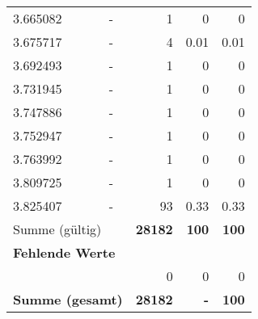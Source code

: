 \begin{longtable}{lXrrr}
        3.665082 & \multicolumn{1}{X}{-} & %
          \num{1} &
          \num[round-mode=places,round-precision=2]{0} &
          \num[round-mode=places,round-precision=2]{0} \\

        3.675717 & \multicolumn{1}{X}{-} & %
          \num{4} &
          \num[round-mode=places,round-precision=2]{0.01} &
          \num[round-mode=places,round-precision=2]{0.01} \\

        3.692493 & \multicolumn{1}{X}{-} & %
          \num{1} &
          \num[round-mode=places,round-precision=2]{0} &
          \num[round-mode=places,round-precision=2]{0} \\

        3.731945 & \multicolumn{1}{X}{-} & %
          \num{1} &
          \num[round-mode=places,round-precision=2]{0} &
          \num[round-mode=places,round-precision=2]{0} \\

        3.747886 & \multicolumn{1}{X}{-} & %
          \num{1} &
          \num[round-mode=places,round-precision=2]{0} &
          \num[round-mode=places,round-precision=2]{0} \\

        3.752947 & \multicolumn{1}{X}{-} & %
          \num{1} &
          \num[round-mode=places,round-precision=2]{0} &
          \num[round-mode=places,round-precision=2]{0} \\

        3.763992 & \multicolumn{1}{X}{-} & %
          \num{1} &
          \num[round-mode=places,round-precision=2]{0} &
          \num[round-mode=places,round-precision=2]{0} \\

        3.809725 & \multicolumn{1}{X}{-} & %
          \num{1} &
          \num[round-mode=places,round-precision=2]{0} &
          \num[round-mode=places,round-precision=2]{0} \\

        3.825407 & \multicolumn{1}{X}{-} & %
          \num{93} &
          \num[round-mode=places,round-precision=2]{0.33} &
          \num[round-mode=places,round-precision=2]{0.33} \\

     \midrule
     \multicolumn{2}{l}{Summe (gültig)} &
       \textbf{\num{28182}} &
     \textbf{\num{100}} &
       \textbf{\num[round-mode=places,round-precision=2]{100}} \\
     \multicolumn{5}{l}{\textbf{Fehlende Werte}}\\
      & & 0 & 0 & 0 \\
     \midrule
     \multicolumn{2}{l}{\textbf{Summe (gesamt)}} &
          \textbf{\num{28182}} &
        \textbf{-} &
        \textbf{\num{100}} \\
     \bottomrule
     \end{longtable}
     

